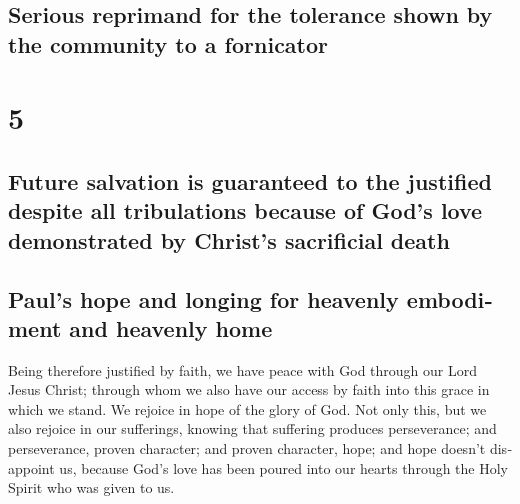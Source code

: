 \begin{paracol}{2}
\switchcolumn
\begin{otherlanguage}{english}

\hypertarget{serious-reprimand-for-the-tolerance-shown-by-the-community-to-a-fornicator}{%
\subsection{Serious reprimand for the tolerance shown by the community
to a
fornicator}\label{serious-reprimand-for-the-tolerance-shown-by-the-community-to-a-fornicator}}

\hypertarget{section-9}{%
\section{5}\label{section-9}}

\hypertarget{future-salvation-is-guaranteed-to-the-justified-despite-all-tribulations-because-of-gods-love-demonstrated-by-christs-sacrificial-death}{%
\subsection{Future salvation is guaranteed to the justified despite all
tribulations because of God's love demonstrated by Christ's sacrificial
death}\label{future-salvation-is-guaranteed-to-the-justified-despite-all-tribulations-because-of-gods-love-demonstrated-by-christs-sacrificial-death}}

\hypertarget{pauls-hope-and-longing-for-heavenly-embodiment-and-heavenly-home}{%
\subsection{Paul's hope and longing for heavenly embodiment and heavenly
home}\label{pauls-hope-and-longing-for-heavenly-embodiment-and-heavenly-home}}

 Being therefore justified by faith, we have peace with
God through our Lord Jesus Christ;  through whom we also
have our access by faith into this grace in which we stand. We rejoice
in hope of the glory of God.  Not only this, but we also
rejoice in our sufferings, knowing that suffering produces perseverance;
 and perseverance, proven character; and proven character,
hope;  and hope doesn't disappoint us, because God's love
has been poured into our hearts through the Holy Spirit who was given to
us.

\hypertarget{general-admonition-to-moral-purity-with-reference-to-the-sacrificial-death-of-jesus-the-passover-lamb}{%
}
\end{otherlanguage}
\end{paracol}
